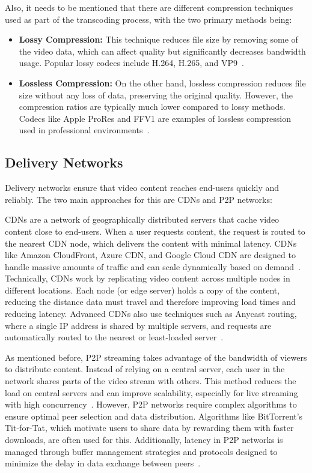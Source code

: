 Also, it needs to be mentioned that there are different compression techniques used as part of the transcoding process, with the two primary methods being:

\begin{itemize}
    \item \textbf{Lossy Compression:} This technique reduces file size by removing some of the video data, which can affect quality but significantly decreases bandwidth usage. Popular lossy codecs include H.264, H.265, and VP9~\parencite{combression}.
    \item \textbf{Lossless Compression:} On the other hand, lossless compression reduces file size without any loss of data, preserving the original quality. However, the compression ratios are typically much lower compared to lossy methods. Codecs like Apple ProRes and FFV1 are examples of lossless compression used in professional environments~\parencite{combression}.
\end{itemize}

\subsection{Delivery Networks}
Delivery networks ensure that video content reaches end-users quickly and reliably. The two main approaches for this are \ac{CDN}s and \ac{P2P} networks:

\ac{CDN}s are a network of geographically distributed servers that cache video content close to end-users. When a user requests content, the request is routed to the nearest \ac{CDN} node, which delivers the content with minimal latency. \ac{CDN}s like Amazon CloudFront, Azure CDN, and Google Cloud CDN are designed to handle massive amounts of traffic and can scale dynamically based on demand~\parencite{cdn_basic}.
Technically, \ac{CDN}s work by replicating video content across multiple nodes in different locations. Each node (or edge server) holds a copy of the content, reducing the distance data must travel and therefore improving load times and reducing latency. Advanced \ac{CDN}s also use techniques such as Anycast routing, where a single IP address is shared by multiple servers, and requests are automatically routed to the nearest or least-loaded server~\parencite{cdn_basic}.
    
As mentioned before, \ac{P2P} streaming takes advantage of the bandwidth of viewers to distribute content. Instead of relying on a central server, each user in the network shares parts of the video stream with others. This method reduces the load on central servers and can improve scalability, especially for live streaming with high concurrency~\parencite{cdn_basic}.
However, \ac{P2P} networks require complex algorithms to ensure optimal peer selection and data distribution. Algorithms like BitTorrent's Tit-for-Tat, which motivate users to share data by rewarding them with faster downloads, are often used for this. Additionally, latency in \ac{P2P} networks is managed through buffer management strategies and protocols designed to minimize the delay in data exchange between peers~\parencite{p2p}.

